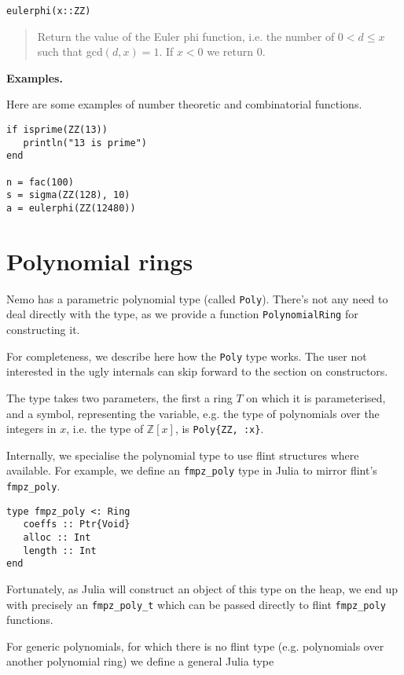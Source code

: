 \documentclass[a4paper,10pt]{article}
\newcommand{\Z}{\mathbb{Z}}
\newcommand{\code}{\lstinline}
\newcommand{\desc}[1]{\vspace{-3mm}\begin{quote}#1\end{quote}}
\begin{document}
{{{\begin{lstlisting}
eulerphi(x::ZZ)
\end{lstlisting}

\desc{Return the value of the Euler phi function, i.e. the number of $0 < d \leq x$ such
that gcd$(d, x) = 1$. If $x < 0$ we return $0$.}

\textbf{Examples.}

Here are some examples of number theoretic and combinatorial functions.

\begin{lstlisting}
if isprime(ZZ(13))
   println("13 is prime")
end

n = fac(100)
s = sigma(ZZ(128), 10)
a = eulerphi(ZZ(12480))
\end{lstlisting}

\section{Polynomial rings}

Nemo has a parametric polynomial type (called \code{Poly}). There's not any need to deal
directly with the type, as we provide a function \code{PolynomialRing} for constructing
it.

For completeness, we describe here how the \code{Poly} type works. The user not interested
in the ugly internals can skip forward to the section on constructors.

The type takes two parameters, the first a ring $T$ on which it is parameterised, and a
symbol, representing the variable, e.g. the type of polynomials over the integers in $x$, 
i.e. the type of $\Z[x]$, is \code|Poly{ZZ, :x}|.

Internally, we specialise the polynomial type to use flint structures where available.
For example, we define an \code{fmpz_poly} type in Julia to mirror flint's \code{fmpz_poly}.

\begin{lstlisting}
type fmpz_poly <: Ring
   coeffs :: Ptr{Void}
   alloc :: Int
   length :: Int
end
\end{lstlisting}

Fortunately, as Julia will construct an object of this type on the heap, we end up with
precisely an \code{fmpz_poly_t} which can be passed directly to flint \code{fmpz_poly}
functions.

For generic polynomials, for which there is no flint type (e.g. polynomials over another
polynomial ring) we define a general Julia type

}}}
\end{document}
